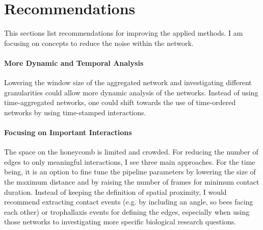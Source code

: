 \section{Recommendations}
This sections list recommendations for improving the applied methods. I am focusing on concepts to reduce the noise within the network.


\paragraph{More Dynamic and Temporal Analysis}
Lowering the window size of the aggregated network and investigating different granularities could allow more dynamic analysis of the networks.
Instead of using time-aggregated networks, one could shift towards the use of time-ordered networks by using time-stamped interactions.


\paragraph{Focusing on Important Interactions}
The space on the honeycomb is limited and crowded.
For reducing the number of edges to only meaningful interactions, I see three main approaches.
For the time being, it is an option to fine tune the pipeline parameters by lowering the size of the maximum distance and by raising the number of frames for minimum contact duration.
Instead of keeping the definition of spatial proximity, I would recommend extracting contact events (e.g. by including an angle, so bees facing each other) or trophallaxis events for defining the edges, especially when using those networks to investigating more specific biological research questions.


